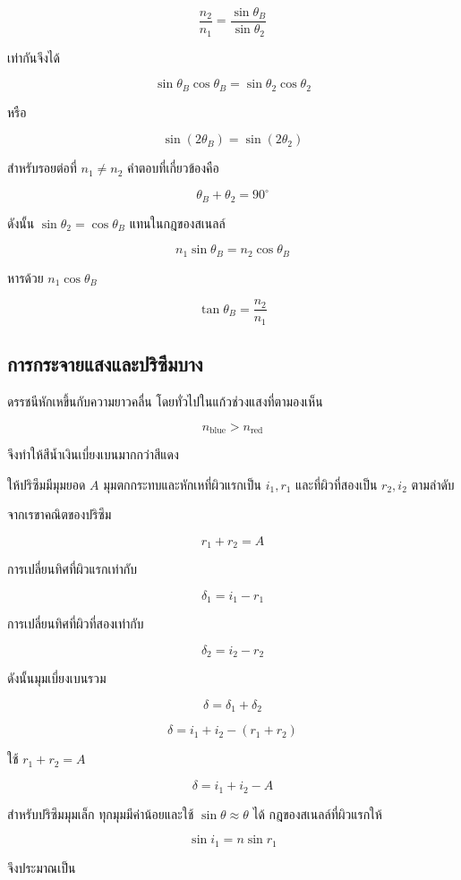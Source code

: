 \[
\frac{n_2}{n_1}
=
\frac{\sin\theta_B}{\sin\theta_2}
\]

เท่ากันจึงได้

\[
\sin\theta_B\cos\theta_B
=
\sin\theta_2\cos\theta_2
\]

หรือ

\[
\sin(2\theta_B)=\sin(2\theta_2)
\]

สำหรับรอยต่อที่ $n_1\ne n_2$ คำตอบที่เกี่ยวข้องคือ

\[
\theta_B+\theta_2=90^\circ
\]

ดังนั้น $\sin\theta_2=\cos\theta_B$ แทนในกฎของสเนลล์

\[
n_1\sin\theta_B=n_2\cos\theta_B
\]

หารด้วย $n_1\cos\theta_B$

\begin{tcolorbox}[title={กฎของบริวสเตอร์}]
\[
\boxed{\tan\theta_B=\frac{n_2}{n_1}}
\]
\end{tcolorbox}

\subsection{การกระจายแสงและปริซึมบาง}

ดรรชนีหักเหขึ้นกับความยาวคลื่น โดยทั่วไปในแก้วช่วงแสงที่ตามองเห็น

\[
n_{\text{blue}}>n_{\text{red}}
\]

จึงทำให้สีน้ำเงินเบี่ยงเบนมากกว่าสีแดง

ให้ปริซึมมีมุมยอด $A$ มุมตกกระทบและหักเหที่ผิวแรกเป็น $i_1,r_1$ และที่ผิวที่สองเป็น $r_2,i_2$ ตามลำดับ

จากเรขาคณิตของปริซึม

\[
r_1+r_2=A
\]

การเปลี่ยนทิศที่ผิวแรกเท่ากับ

\[
\delta_1=i_1-r_1
\]

การเปลี่ยนทิศที่ผิวที่สองเท่ากับ

\[
\delta_2=i_2-r_2
\]

ดังนั้นมุมเบี่ยงเบนรวม

\[
\delta=\delta_1+\delta_2
\]

\[
\delta=i_1+i_2-(r_1+r_2)
\]

ใช้ $r_1+r_2=A$

\[
\delta=i_1+i_2-A
\]

สำหรับปริซึมมุมเล็ก ทุกมุมมีค่าน้อยและใช้ $\sin\theta\approx\theta$ ได้ กฎของสเนลล์ที่ผิวแรกให้

\[
\sin i_1=n\sin r_1
\]

จึงประมาณเป็น

